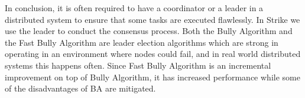 \documentclass[dareport.tex]{subfiles}
\begin{document}
In conclusion, it is often required to have a coordinator or a leader in a distributed system to ensure that some tasks are executed flawlessly. In Strike we use the leader to conduct the consensus process. Both the Bully Algorithm and the Fast Bully Algorithm are leader election algorithms which are strong in operating in an environment where nodes could fail, and in real world distributed systems this happens often. Since Fast Bully Algorithm is an incremental improvement on top of Bully Algorithm, it has increased performance while some of the disadvantages of BA are mitigated.
\end{document}
